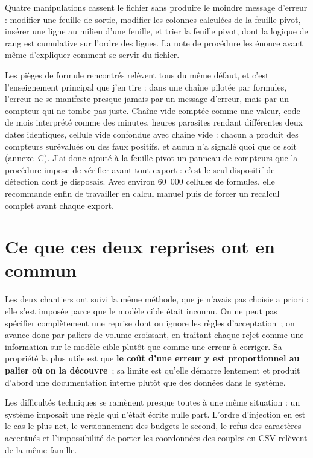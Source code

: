 Quatre manipulations cassent le fichier sans produire le moindre message d'erreur : modifier
une feuille de sortie, modifier les colonnes calculées de la feuille pivot, insérer une ligne
au milieu d'une feuille, et trier la feuille pivot, dont la logique de rang est cumulative sur
l'ordre des lignes. La note de procédure les énonce avant même d'expliquer comment se servir
du fichier.

Les pièges de formule rencontrés relèvent tous du même défaut, et c'est l'enseignement
principal que j'en tire : dans une chaîne pilotée par formules, l'erreur ne se manifeste
presque jamais par un message d'erreur, mais par un compteur qui ne tombe pas juste. Chaîne
vide comptée comme une valeur, code de mois interprété comme des minutes, heures parasites
rendant différentes deux dates identiques, cellule vide confondue avec chaîne vide : chacun a
produit des compteurs surévalués ou des faux positifs, et aucun n'a signalé quoi que ce soit
(annexe~C). J'ai donc ajouté à la feuille pivot un panneau de compteurs que la procédure
impose de vérifier avant tout export : c'est le seul dispositif de détection dont je
disposais. Avec environ 60~000 cellules de formules, elle recommande enfin de travailler en
calcul manuel puis de forcer un recalcul complet avant chaque export.

\hypertarget{ce-que-ces-deux-reprises-ont-en-commun}{%
\section{Ce que ces deux reprises ont en commun}\label{ce-que-ces-deux-reprises-ont-en-commun}}

Les deux chantiers ont suivi la même méthode, que je n'avais pas choisie a priori : elle s'est
imposée parce que le modèle cible était inconnu. On ne peut pas spécifier complètement une
reprise dont on ignore les règles d'acceptation~; on avance donc par paliers de volume
croissant, en traitant chaque rejet comme une information sur le modèle cible plutôt que comme
une erreur à corriger. Sa propriété la plus utile est que \textbf{le coût d'une erreur y est
proportionnel au palier où on la découvre}~; sa limite est qu'elle démarre lentement et produit
d'abord une documentation interne plutôt que des données dans le système.

Les difficultés techniques se ramènent presque toutes à une même situation : un système
imposait une règle qui n'était écrite nulle part. L'ordre d'injection en est le cas le plus
net, le versionnement des budgets le second, le refus des caractères accentués et
l'impossibilité de porter les coordonnées des couples en CSV relèvent de la même famille.

